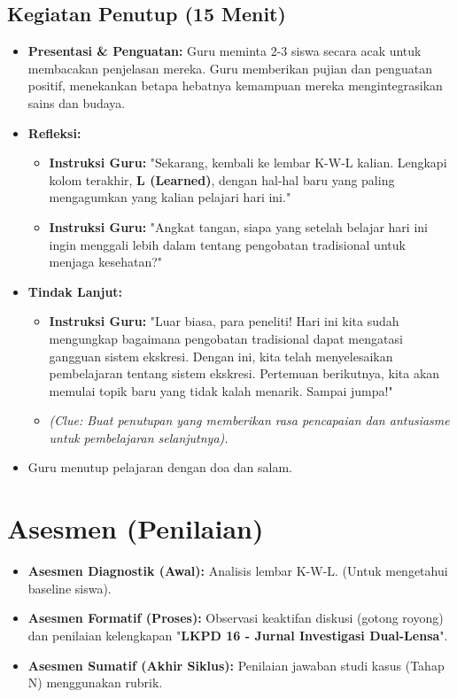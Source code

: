 \documentclass[a4paper,12pt]{article}
\begin{document}
\subsection{Kegiatan Penutup (15 Menit)}
\begin{itemize}
\item \textbf{Presentasi \& Penguatan:} Guru meminta 2-3 siswa secara acak untuk membacakan penjelasan mereka. Guru memberikan pujian dan penguatan positif, menekankan betapa hebatnya kemampuan mereka mengintegrasikan sains dan budaya.
\item \textbf{Refleksi:}
    \begin{itemize}
    \item \textbf{Instruksi Guru:} "Sekarang, kembali ke lembar K-W-L kalian. Lengkapi kolom terakhir, \textbf{L (Learned)}, dengan hal-hal baru yang paling mengagumkan yang kalian pelajari hari ini."
    \item \textbf{Instruksi Guru:} "Angkat tangan, siapa yang setelah belajar hari ini ingin menggali lebih dalam tentang pengobatan tradisional untuk menjaga kesehatan?"
    \end{itemize}
\item \textbf{Tindak Lanjut:}
    \begin{itemize}
    \item \textbf{Instruksi Guru:} "Luar biasa, para peneliti! Hari ini kita sudah mengungkap bagaimana pengobatan tradisional dapat mengatasi gangguan sistem ekskresi. Dengan ini, kita telah menyelesaikan pembelajaran tentang sistem ekskresi. Pertemuan berikutnya, kita akan memulai topik baru yang tidak kalah menarik. Sampai jumpa!"
    \item \textit{(Clue: Buat penutupan yang memberikan rasa pencapaian dan antusiasme untuk pembelajaran selanjutnya).}
    \end{itemize}
\item Guru menutup pelajaran dengan doa dan salam.
\end{itemize}

\section{Asesmen (Penilaian)}

\begin{itemize}
\item \textbf{Asesmen Diagnostik (Awal):} Analisis lembar K-W-L. (Untuk mengetahui baseline siswa).
\item \textbf{Asesmen Formatif (Proses):} Observasi keaktifan diskusi (gotong royong) dan penilaian kelengkapan "\textbf{LKPD 16 - Jurnal Investigasi Dual-Lensa}".
\item \textbf{Asesmen Sumatif (Akhir Siklus):} Penilaian jawaban studi kasus (Tahap N) menggunakan rubrik.
\end{itemize}
\end{document}

